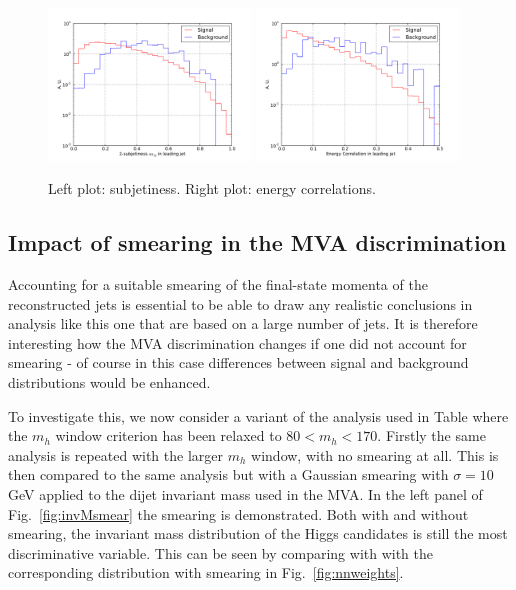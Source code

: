 \begin{figure}[t]
\begin{center}
  \includegraphics[width=0.48\textwidth]{plots/tau21_h0_res_C1_boost.pdf}
  \includegraphics[width=0.48\textwidth]{plots/EEC_C2_h0_res_C1_boost.pdf}
  \caption{\small Left plot: subjetiness.
    Right plot: energy correlations.
}
\label{fig:mva_substructure_1}
\end{center}
\end{figure}



\subsection{Impact of smearing in the MVA discrimination}

Accounting for a suitable smearing of the final-state momenta of the reconstructed
jets is essential to be able to draw any realistic conclusions in analysis like
this one that are based on a large number of jets.
%
It is therefore interesting how the MVA discrimination changes if one did not account
for smearing - of course in this case differences between signal and background distributions
would be enhanced.

To investigate this, we now consider a variant of the analysis used in
Table  where the $m_h$ window criterion has been relaxed to $80 < m_h < 170$.
%
Firstly the same analysis is repeated with the larger $m_h$ window, with no smearing at all.
%
This is then compared to the same analysis but with a Gaussian smearing with $\sigma=10$ GeV applied to the dijet invariant mass used in the MVA.
%
In the left panel of Fig.~\ref{fig:invMsmear} the smearing is demonstrated.
%
Both with and without smearing, the  invariant mass distribution of the
Higgs candidates is still the most discriminative variable.
%
This can be seen by comparing with   with the corresponding distribution with smearing in
  Fig.~\ref{fig:nnweights}.




